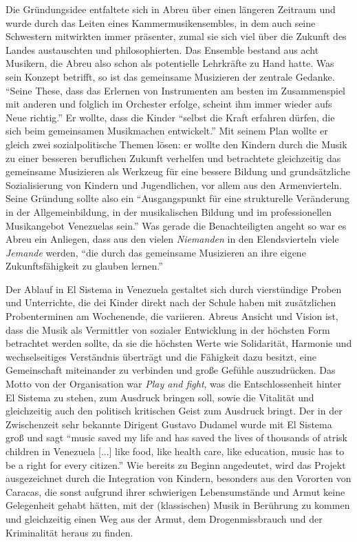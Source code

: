 Die Gründungsidee entfaltete sich in Abreu über einen längeren
Zeitraum und wurde durch das Leiten eines Kammermusikensembles, in dem auch
seine Schwestern mitwirkten immer präsenter, zumal sie sich viel über die
Zukunft des Landes austauschten und philosophierten. Das Ensemble bestand aus
acht Musikern, die Abreu also schon als potentielle Lehrkräfte zu Hand hatte.
\autocite[34]{kaufmann:el_sistema} Was sein Konzept betrifft, so ist das
gemeinsame Musizieren der zentrale Gedanke. \enquote{Seine These, dass das
Erlernen von Instrumenten am besten im Zusammenspiel mit anderen und folglich im
Orchester erfolge, scheint ihm immer wieder aufs Neue
richtig.}\autocite[34]{kaufmann:el_sistema} Er wollte, dass die Kinder
\enquote{selbst die Kraft erfahren dürfen, die sich beim gemeinsamen Musikmachen
entwickelt.}\autocite[34]{kaufmann:el_sistema} Mit seinem Plan wollte er gleich
zwei sozialpolitische Themen lösen: er wollte den Kindern durch die Musik zu
einer besseren beruflichen Zukunft verhelfen und betrachtete gleichzeitig das
gemeinsame Musizieren als Werkzeug für eine bessere Bildung und grundsätzliche
Sozialisierung von Kindern und Jugendlichen, vor allem aus den Armenvierteln.
Seine Gründung sollte also ein \enquote{Ausgangspunkt für eine strukturelle
Veränderung in der Allgemeinbildung, in der musikalischen Bildung und im
professionellen Musikangebot Venezuelas sein.}\autocite[38]{kaufmann:el_sistema}
Was gerade die Benachteiligten angeht so war es Abreu ein Anliegen, dass aus den
vielen \emph{Niemanden} in den Elendsvierteln viele \emph{Jemande} werden, \enquote{die durch
das gemeinsame Musizieren an ihre eigene Zukunftsfähigkeit zu glauben
lernen.}\autocite[39]{kaufmann:el_sistema}

Der Ablauf in El Sistema in Venezuela gestaltet sich durch vierstündige Proben
und Unterrichte, die dei Kinder direkt nach der Schule haben mit zusätzlichen
Probenterminen am Wochenende, die variieren. Abreus Ansicht und Vision ist, dass
die Musik als Vermittler von sozialer Entwicklung in der höchsten Form
betrachtet werden sollte, da sie die höchsten Werte wie Solidarität, Harmonie
und wechselseitiges Verständnis überträgt und die Fähigkeit dazu besitzt, eine
Gemeinschaft miteinander zu verbinden und große Gefühle auszudrücken. Das Motto
von der Organisation war \emph{Play and fight}, was die Entschlossenheit hinter
El Sistema zu stehen, zum Ausdruck bringen soll, sowie die Vitalität und
gleichzeitig auch den politisch kritischen Geist zum Ausdruck bringt. Der in der
Zwischenzeit sehr bekannte Dirigent Gustavo Dudamel wurde mit El Sistema groß
und sagt \enquote{music saved my life and has saved the lives of thousands of
atrisk children in Venezuela [...] like food, like health care, like education,
music has to be a right for every citizen.}\autocite{wikipedia:el_sistema} Wie
bereits zu Beginn angedeutet, wird das Projekt ausgezeichnet durch die
Integration von Kindern, besonders aus den Vororten von Caracas, die sonst
aufgrund ihrer schwierigen Lebensumstände und Armut keine Gelegenheit gehabt
hätten, mit der (klassischen) Musik in Berührung zu kommen und gleichzeitig
einen Weg aus der Armut, dem Drogenmissbrauch und der Kriminalität heraus zu
finden.

